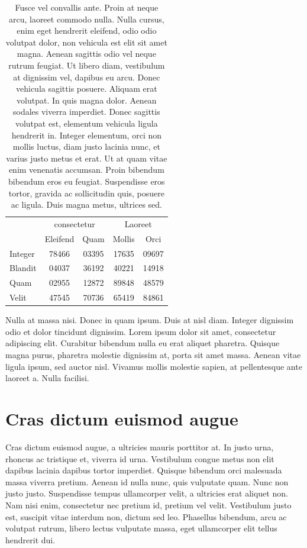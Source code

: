 \begin{table}[!t]
  \centering
  \begin{tabular}{lcccc}
    \toprule
    & \multicolumn{2}{c}{consectetur} & \multicolumn{2}{c}{Laoreet}\\\cmidrule(r){2-3}\cmidrule(r){4-5}
    & Eleifend & Quam & Mollis & Orci\\
    \midrule
    Integer	& 78466 & 03395 & 17635 & 09697\\
    Blandit	& 04037 & 36192 & 40221 & 14918\\
    Quam		& 02955 & 12872 & 89848 & 48579\\
    Velit		& 47545 & 70736 & 65419 & 84861\\
    \bottomrule
  \end{tabular}
  \caption[Fusce vel convallis ante]{
    Fusce vel convallis ante.
Proin at neque arcu, laoreet commodo nulla.
Nulla cursus, enim eget hendrerit eleifend, odio odio volutpat dolor, non vehicula est elit sit amet magna.
Aenean sagittis odio vel neque rutrum feugiat.
Ut libero diam, vestibulum at dignissim vel, dapibus eu arcu.
Donec vehicula sagittis posuere.
Aliquam erat volutpat.
In quis magna dolor.
Aenean sodales viverra imperdiet.
Donec sagittis volutpat est, elementum vehicula ligula hendrerit in.
Integer elementum, orci non mollis luctus, diam justo lacinia nunc, et varius justo metus et erat.
Ut at quam vitae enim venenatis accumsan.
Proin bibendum bibendum eros eu feugiat.
Suspendisse eros tortor, gravida ac sollicitudin quis, posuere ac ligula.
Duis magna metus, ultrices sed.
  }
\end{table}

Nulla at massa nisi.
Donec in quam ipsum.
Duis at nisl diam.
Integer dignissim odio et dolor tincidunt dignissim.
Lorem ipsum dolor sit amet, consectetur adipiscing elit.
Curabitur bibendum nulla eu erat aliquet pharetra.
Quisque magna purus, pharetra molestie dignissim at, porta sit amet massa.
Aenean vitae ligula ipsum, sed auctor nisl.
Vivamus mollis molestie sapien, at pellentesque ante laoreet a.
Nulla facilisi.

\section{Cras dictum euismod augue}
Cras dictum euismod augue, a ultricies mauris porttitor at.
In justo urna, rhoncus ac tristique et, viverra id urna.
Vestibulum congue metus non elit dapibus lacinia dapibus tortor imperdiet.
Quisque bibendum orci malesuada massa viverra pretium.
Aenean id nulla nunc, quis vulputate quam.
Nunc non justo justo.
Suspendisse tempus ullamcorper velit, a ultricies erat aliquet non.
Nam nisi enim, consectetur nec pretium id, pretium vel velit.
Vestibulum justo est, suscipit vitae interdum non, dictum sed leo.
Phasellus bibendum, arcu ac volutpat rutrum, libero lectus vulputate massa, eget ullamcorper elit tellus hendrerit dui.

